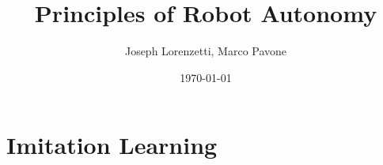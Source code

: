 \documentclass[nohyper,nobib]{tufte-book}
\title{Principles of Robot Autonomy}
\author{Joseph Lorenzetti, Marco Pavone}
\date{\today}
\begin{document}
\chapter{Imitation Learning}


\printbibliography
\end{document}
